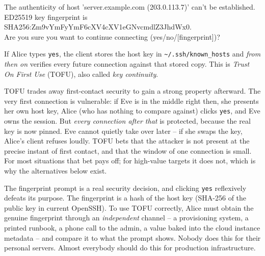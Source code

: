\begin{center}\ttfamily
The authenticity of host 'server.example.com (203.0.113.7)' can't be established.\\
ED25519 key fingerprint is SHA256:Zm9vYmFyYmF6cXV4cXV1eGNvcmdlZ3JhdWx0.\\
Are you sure you want to continue connecting (yes/no/[fingerprint])?
\end{center}

If Alice types \texttt{yes}, the client stores the host key in \texttt{\textasciitilde/.ssh/known\_hosts} and \emph{from then on} verifies every future connection against that stored copy. This is \emph{Trust On First Use} (TOFU), also called \emph{key continuity}.

\begin{intuitionbox}
TOFU trades away first-contact security to gain a strong property afterward. The very first connection is vulnerable: if Eve is in the middle right then, she presents her own host key, Alice (who has nothing to compare against) clicks \texttt{yes}, and Eve owns the session. But \emph{every connection after that} is protected, because the real key is now pinned. Eve cannot quietly take over later -- if she swaps the key, Alice's client refuses loudly. TOFU bets that the attacker is not present at the precise instant of first contact, and that the window of one connection is small. For most situations that bet pays off; for high-value targets it does not, which is why the alternatives below exist.
\end{intuitionbox}

\begin{trapbox}
The fingerprint prompt is a real security decision, and clicking \texttt{yes} reflexively defeats its purpose. The fingerprint is a hash of the host key (SHA-256 of the public key in current OpenSSH). To use TOFU correctly, Alice must obtain the genuine fingerprint through an \emph{independent} channel -- a provisioning system, a printed runbook, a phone call to the admin, a value baked into the cloud instance metadata -- and compare it to what the prompt shows. Nobody does this for their personal servers. Almost everybody should do this for production infrastructure.
\end{trapbox}

